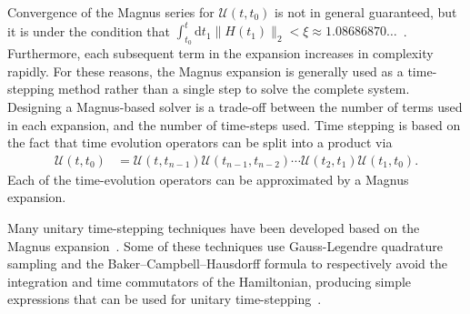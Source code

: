 \documentclass{jors}
\begin{document}
		Convergence of the Magnus series for $ \mathcal{U}(t, t_0) $ is not in general guaranteed, but it is under the condition that $ \int_{t_0}^t\text{d}t_1\|H(t_1)\|_2 < \xi \approx 1.08686870\dots $~\cite{blanes_magnus_2009}.
		Furthermore, each subsequent term in the expansion increases in complexity rapidly.
		For these reasons, the Magnus expansion is generally used as a time-stepping method rather than a single step to solve the complete system.
		Designing a Magnus-based solver is a trade-off between the number of terms used in each expansion, and the number of time-steps used.
		Time stepping is based on the fact that time evolution operators can be split into a product via
		\begin{align}
			\mathcal{U}(t, t_0) &= \mathcal{U}(t, t_{n - 1})\mathcal{U}(t_{n - 1}, t_{n - 2})\cdots\mathcal{U}(t_2, t_1)\mathcal{U}(t_1, t_0).\label{eq:product_of_time_evolution}
		\end{align}
		Each of the time-evolution operators can be approximated by a Magnus expansion.


		Many unitary time-stepping techniques have been developed based on the Magnus expansion~\cite{auer_magnus_2018}.
		Some of these techniques use Gauss-Legendre quadrature sampling and the Baker–Campbell–Hausdorff formula to respectively avoid the integration and time commutators of the Hamiltonian, producing simple expressions that can be used for unitary time-stepping~\cite{blanes_fourth-_2006}.
		
\end{document}
